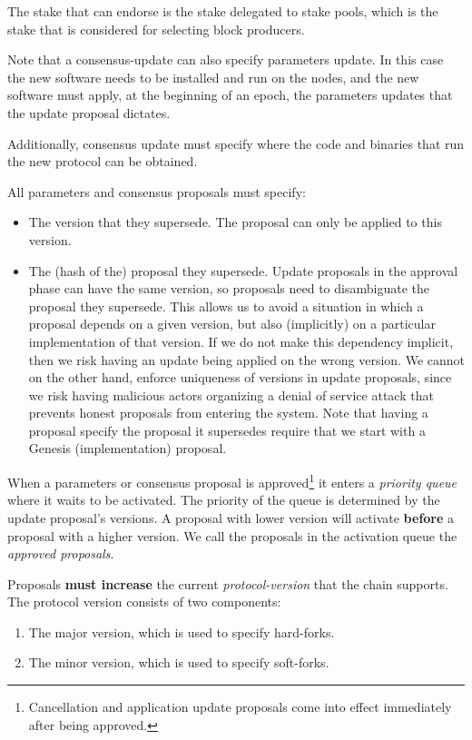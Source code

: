 The stake that can endorse is the stake delegated to stake pools, which is the
stake that is considered for selecting block producers.

Note that a consensus-update can also specify parameters update. In this case
the new software needs to be installed and run on the nodes, and the new
software must apply, at the beginning of an epoch, the parameters updates that
the update proposal dictates.

Additionally, consensus update must specify where the code and binaries that
run the new protocol can be obtained.

All parameters and consensus proposals must specify:
\begin{itemize}
	\item The version that they supersede. The proposal can only be applied to 
	this
	version.
	\item The (hash of the) proposal they supersede. Update proposals in the
	approval phase can have the same version, so proposals need to disambiguate
	the proposal they supersede. This allows us to avoid a situation in which a
	proposal depends on a given version, but also (implicitly) on a particular
	implementation of that version. If we do not make this dependency implicit,
	then we risk having an update being applied on the wrong version.
	We cannot on the other hand, enforce uniqueness of versions in update
	proposals, since we risk having malicious actors organizing a denial of
	service attack that prevents honest proposals from entering the system.
	Note that having a proposal specify the proposal it supersedes require that 
	we
	start with a Genesis (implementation) proposal.
\end{itemize}

When a parameters or consensus proposal is approved\footnote{Cancellation and
	application update proposals come into effect immediately after being
	approved.} it enters a \emph{priority queue} where it waits to be activated.
The priority of the queue is determined by the update proposal's versions. A
proposal with lower version will activate \textbf{before} a 
proposal with a
higher version.
%
We call the proposals in the activation queue the \emph{approved proposals}.

Proposals \textbf{must increase} the current \emph{protocol-version} that the
chain supports. The protocol version consists of two components:
\begin{enumerate}
	\item The major version, which is used to specify hard-forks.
	\item The minor version, which is used to specify soft-forks.
\end{enumerate}

